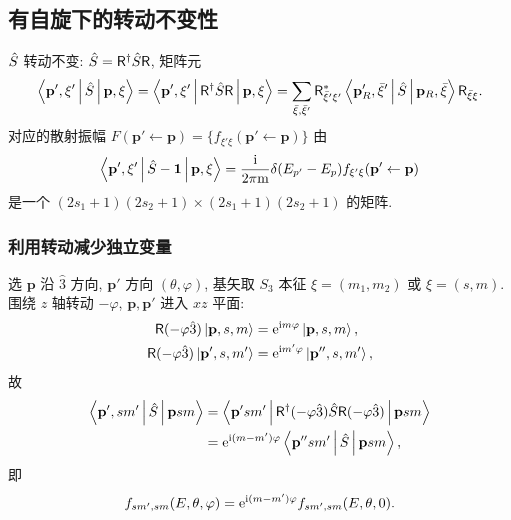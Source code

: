 \subsection{有自旋下的转动不变性}

$\hat{S}$ 转动不变: $\hat{S}=\mathsf{R}^\dagger \hat{S} \mathsf{R}$, 矩阵元
\[
\left\langle \mathbf{p}',\xi' \,\middle|\, \hat{S} \,\middle|\, \mathbf{p},\xi \right\rangle=\left\langle \mathbf{p}',\xi' \,\middle|\, \mathsf{R}^\dagger \hat{S} \mathsf{R} \,\middle|\, \mathbf{p},\xi \right\rangle=\sum_{\bar\xi,\bar\xi'}\mathsf{R}^*_{\bar\xi'\xi'}\left\langle \mathbf{p}'_R,\bar\xi' \,\middle|\, \hat{S} \,\middle|\, \mathbf{p}_R,\bar\xi \right\rangle\mathsf{R}_{\bar\xi\xi}.
\]
对应的散射振幅 $F(\mathbf{p}'\leftarrow \mathbf{p})=\{f_{\xi'\xi}(\mathbf{p}'\leftarrow \mathbf{p})\}$ 由
\begin{equation}
\left\langle \mathbf{p}',\xi' \,\middle|\, \hat{S}-\mathbf{1} \,\middle|\, \mathbf{p},\xi \right\rangle=\frac{\mathrm{i}}{2\pi \mathrm{m}}\delta(E_{p'}-E_p)f_{\xi'\xi}(\mathbf{p}'\leftarrow \mathbf{p})
\end{equation}
是一个 $(2s_1+1)(2s_2+1)\times (2s_1+1)(2s_2+1)$ 的矩阵.

\subsubsection*{利用转动减少独立变量}

选 $\mathbf{p}$ 沿 $\hat{3}$ 方向, $\mathbf{p}'$ 方向 $(\theta,\varphi)$, 基矢取 $S_3$ 本征 $\xi=(m_1,m_2)$ 或 $\xi=(s,m)$. 围绕 $z$ 轴转动 $-\varphi$, $\mathbf{p}, \mathbf{p}'$ 进入 $xz$ 平面:
\begin{align}
\mathsf{R}(-\varphi\hat{3})\ket{\mathbf{p},s,m}&=\mathrm{e}^{\mathrm{i} m\varphi}\ket{\mathbf{p},s,m},\nonumber\\
\mathsf{R}(-\varphi\hat{3})\ket{\mathbf{p}',s,m'}&=\mathrm{e}^{\mathrm{i} m'\varphi}\ket{\mathbf{p}'',s,m'},
\end{align}
故
\begin{align}
\left\langle \mathbf{p}',sm' \,\middle|\, \hat{S} \,\middle|\, \mathbf{p}sm \right\rangle&=\left\langle \mathbf{p}'sm' \,\middle|\, \mathsf{R}^\dagger(-\varphi\hat{3})\hat{S} \mathsf{R}(-\varphi\hat{3}) \,\middle|\, \mathbf{p}sm \right\rangle\nonumber\\
&=\mathrm{e}^{\mathrm{i}(m-m')\varphi}\left\langle \mathbf{p}''sm' \,\middle|\, \hat{S} \,\middle|\, \mathbf{p}sm \right\rangle,
\end{align}
即
\begin{equation}\label{eq:phivar}
f_{sm',sm}(E,\theta,\varphi)=\mathrm{e}^{\mathrm{i}(m-m')\varphi}f_{sm',sm}(E,\theta,0).
\end{equation}


